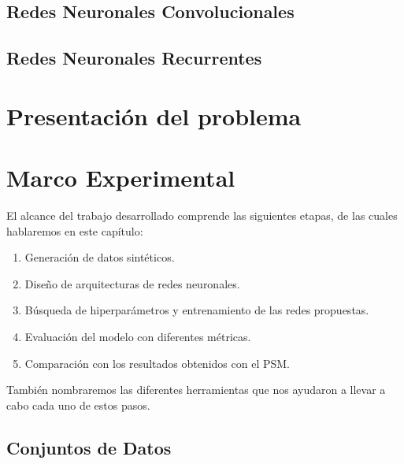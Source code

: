 \documentclass[a4paper,12pt,spanish]{book}
\begin{document}
\section{Redes Neuronales Convolucionales}


\section{Redes Neuronales Recurrentes}


% 

\chapter{Presentación del problema} \label{sec:problema}


\chapter{Marco Experimental}
El alcance del trabajo desarrollado comprende las siguientes etapas, de las cuales
hablaremos en este capítulo:
\begin{enumerate}[itemsep=0.1cm, label=\textbf{\arabic*.}]
    \item Generación de datos sintéticos.
    \item Diseño de arquitecturas de redes neuronales.
    \item Búsqueda de hiperparámetros y entrenamiento de las redes propuestas.
    \item Evaluación del modelo con diferentes métricas.
    \item Comparación con los resultados obtenidos con el PSM.
\end{enumerate}

También nombraremos las diferentes herramientas que nos ayudaron a llevar a cabo
cada uno de estos pasos.

\section{Conjuntos de Datos} \label{sec:datos}

\end{document}
